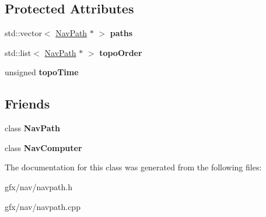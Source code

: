 \subsection*{Protected Attributes}
\begin{DoxyCompactItemize}
\item 
std\+::vector$<$ \hyperlink{classNavPath}{Nav\+Path} $\ast$ $>$ {\bfseries paths}\hypertarget{classPathManager_ac5170a08cac3a91487208aea3b402593}{}\label{classPathManager_ac5170a08cac3a91487208aea3b402593}

\item 
std\+::list$<$ \hyperlink{classNavPath}{Nav\+Path} $\ast$ $>$ {\bfseries topo\+Order}\hypertarget{classPathManager_adf3c5a6ff2712e5d8e36655ea16b10c9}{}\label{classPathManager_adf3c5a6ff2712e5d8e36655ea16b10c9}

\item 
unsigned {\bfseries topo\+Time}\hypertarget{classPathManager_a2074deda73ee4fe8f0e2ff39260a753f}{}\label{classPathManager_a2074deda73ee4fe8f0e2ff39260a753f}

\end{DoxyCompactItemize}
\subsection*{Friends}
\begin{DoxyCompactItemize}
\item 
class {\bfseries Nav\+Path}\hypertarget{classPathManager_ad52bb5f8c5442d6b93c1d3150be08380}{}\label{classPathManager_ad52bb5f8c5442d6b93c1d3150be08380}

\item 
class {\bfseries Nav\+Computer}\hypertarget{classPathManager_a1e201bac6febf7e8408c0fe9f486bf2a}{}\label{classPathManager_a1e201bac6febf7e8408c0fe9f486bf2a}

\end{DoxyCompactItemize}


The documentation for this class was generated from the following files\+:\begin{DoxyCompactItemize}
\item 
gfx/nav/navpath.\+h\item 
gfx/nav/navpath.\+cpp\end{DoxyCompactItemize}

